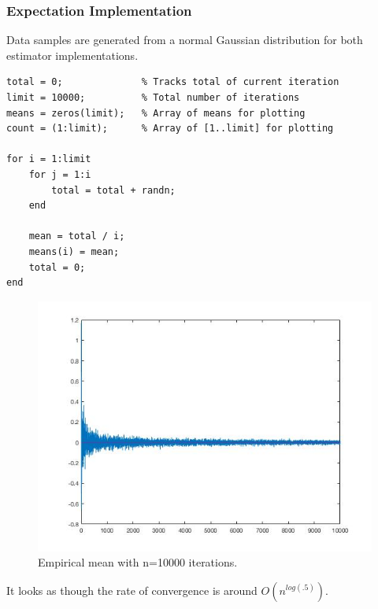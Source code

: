 \documentclass[11pt, oneside]{article}   	%
\begin{document}
\newpage{}
\subsubsection{Expectation Implementation}
Data samples are generated from a normal Gaussian distribution for both estimator implementations.

\begin{verbatim}
total = 0;              % Tracks total of current iteration
limit = 10000;          % Total number of iterations
means = zeros(limit);   % Array of means for plotting
count = (1:limit);      % Array of [1..limit] for plotting

for i = 1:limit
    for j = 1:i
        total = total + randn;
    end
    
    mean = total / i;
    means(i) = mean;
    total = 0;
end
\end{verbatim}

\newpage{}

\begin{figure}
  \includegraphics[width=\linewidth]{mean.jpg}
  \caption{Empirical mean with n=10000 iterations.}
\end{figure}

It looks as though the rate of convergence is around $O(n^{log(.5)})$.

\newpage{}
\end{document}
